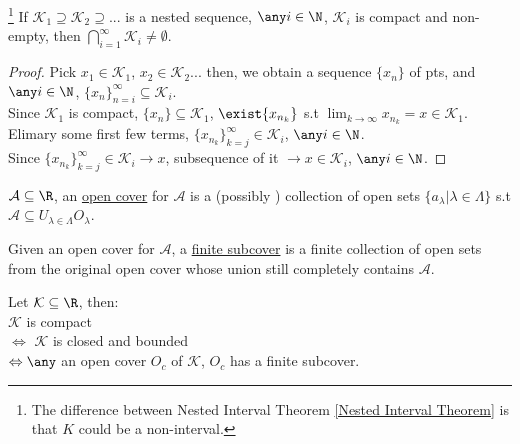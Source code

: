 \begin{theorem}\footnote{The difference between Nested Interval Theorem \ref{Nested Interval Theorem} is that $K$ could be a non-interval.}
\label{Nested Compact Set Property} 
    If $\mathcal{K}_1 \supseteq \mathcal{K}_2 \supseteq...$ is a nested sequence, $\any i \in \N$, $\mathcal{K}_i$ is compact and non-empty, then $\bigcap\limits_{i=1}^\infty \mathcal{K}_i \neq \emptyset$.
\end{theorem}
\begin{proof}
    Pick $x_1 \in \mathcal{K}_1$, $x_2 \in \mathcal{K}_2 ...$ then, we obtain a sequence $\{ x_n\}$ of pts, and $\any i \in \N$, $\{x_n\}_{n=i}^\infty \subseteq \mathcal{K}_i$. \\
    Since $\mathcal{K}_1$ is compact, $\{x_n\} \subseteq \mathcal{K}_1$, $\exist\{x_{n_k}\}$ s.t $\lim_{k\to\infty} x_{n_k} = x \in \mathcal{K}_1$. Elimary some first few terms, $\{x_{n_k}\}_{k=j}^\infty \in \mathcal{K}_i$, $\any i \in \N$. \\
    Since $\{x_{n_k}\}_{k=j}^\infty \in \mathcal{K}_i \rightarrow x$, subsequence of it $\rightarrow x \in \mathcal{K}_i$, $\any i \in \N$.
\end{proof}
\begin{definition}
    $\mathcal{A} \subseteq \R$, an \uline{open cover} for $\mathcal{A}$ is a (possibly ) collection of open sets $\{a_\lambda | \lambda \in \Lambda\}$ s.t $\mathcal{A} \subseteq U_{\lambda \in \Lambda} O_\lambda$.
\end{definition}
\begin{definition}
    Given an open cover for $\mathcal{A}$, a \uline{finite subcover} is a finite collection of open sets from the original open cover whose union still completely contains $\mathcal{A}$.
\end{definition}
\begin{theorem}
\label{Heine-Borel Theorem}
    Let $\mathcal{K} \subseteq \R$, then: \\
    \indent $\mathcal{K}$ is compact \\
    $\Leftrightarrow$ $\mathcal{K}$ is closed and bounded \\
    $\Leftrightarrow \any$ an open cover $O_c$ of $\mathcal{K}$, $O_c$ has a finite subcover.
\end{theorem}

